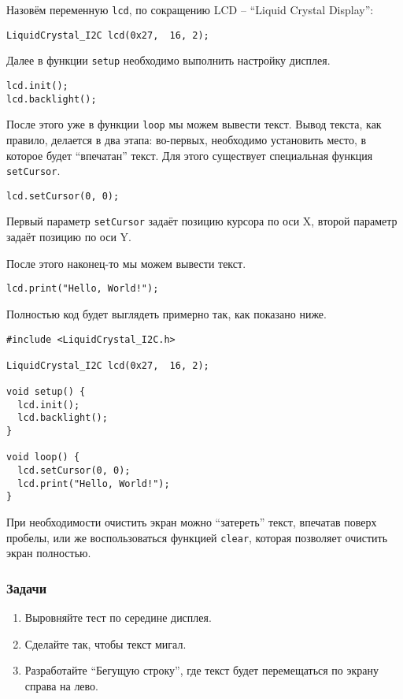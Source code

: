 \documentclass[../sparc.tex]{subfiles}
\begin{document}
Назовём переменную \texttt{lcd}, по сокращению \gls{LCD} -- ``Liquid Crystal
Display'':

\begin{verbatim}
LiquidCrystal_I2C lcd(0x27,  16, 2);
\end{verbatim}

Далее в функции \texttt{setup} необходимо выполнить настройку дисплея.

\begin{verbatim}
lcd.init();
lcd.backlight();
\end{verbatim}

После этого уже в функции \texttt{loop} мы можем вывести текст.  Вывод текста,
как правило, делается в два этапа: во-первых, необходимо установить место, в
которое будет ``впечатан'' текст.  Для этого существует специальная функция
\texttt{setCursor}.

\begin{verbatim}
lcd.setCursor(0, 0);
\end{verbatim}

Первый параметр \texttt{setCursor} задаёт позицию курсора по оси X, второй
параметр задаёт позицию по оси Y.

После этого наконец-то мы можем вывести текст.

\begin{verbatim}
lcd.print("Hello, World!");
\end{verbatim}

Полностью код будет выглядеть примерно так, как показано ниже.

\begin{verbatim}
#include <LiquidCrystal_I2C.h>

LiquidCrystal_I2C lcd(0x27,  16, 2);

void setup() {
  lcd.init();
  lcd.backlight();
}

void loop() {
  lcd.setCursor(0, 0);
  lcd.print("Hello, World!");
}
\end{verbatim}

При необходимости очистить экран можно ``затереть'' текст, впечатав поверх
пробелы, или же воспользоваться функцией \texttt{clear}, которая позволяет
очистить экран полностью.

\subsubsection{Задачи}
\begin{enumerate}
\item Выровняйте тест по середине дисплея.
\item Сделайте так, чтобы текст мигал.
\item Разработайте ``Бегущую строку'', где текст будет перемещаться по экрану
  справа на лево.
\end{enumerate}
\end{document}
